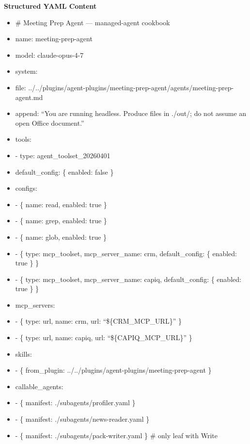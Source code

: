 \documentclass[11pt]{article}
\begin{document}
\textbf{Structured YAML Content}
\begin{itemize}[leftmargin=*,itemsep=2pt,topsep=2pt]
\item {} \# Meeting Prep Agent — managed-agent cookbook
\item {} name: meeting-prep-agent
\item {} model: claude-opus-4-7
\item {} system:
\item {} file: ../../plugins/agent-plugins/meeting-prep-agent/agents/meeting-prep-agent.md
\item {} append: ``You are running headless. Produce files in ./out/; do not assume an open Office document.''
\item {} tools:
\item {} - type: agent\_\allowbreak{}toolset\_\allowbreak{}20260401
\item {} default\_\allowbreak{}config: \{ enabled: false \}
\item {} configs:
\item {} - \{ name: read, enabled: true \}
\item {} - \{ name: grep, enabled: true \}
\item {} - \{ name: glob, enabled: true \}
\item {} - \{ type: mcp\_\allowbreak{}toolset, mcp\_\allowbreak{}server\_\allowbreak{}name: crm, default\_\allowbreak{}config: \{ enabled: true \} \}
\item {} - \{ type: mcp\_\allowbreak{}toolset, mcp\_\allowbreak{}server\_\allowbreak{}name: capiq, default\_\allowbreak{}config: \{ enabled: true \} \}
\item {} mcp\_\allowbreak{}servers:
\item {} - \{ type: url, name: crm, url: ``\$\{CRM\_\allowbreak{}MCP\_\allowbreak{}URL\}'' \}
\item {} - \{ type: url, name: capiq, url: ``\$\{CAPIQ\_\allowbreak{}MCP\_\allowbreak{}URL\}'' \}
\item {} skills:
\item {} - \{ from\_\allowbreak{}plugin: ../../plugins/agent-plugins/meeting-prep-agent \}
\item {} callable\_\allowbreak{}agents:
\item {} - \{ manifest: ./subagents/profiler.yaml \}
\item {} - \{ manifest: ./subagents/news-reader.yaml \}
\item {} - \{ manifest: ./subagents/pack-writer.yaml \} \# only leaf with Write
\end{itemize}
\end{document}
